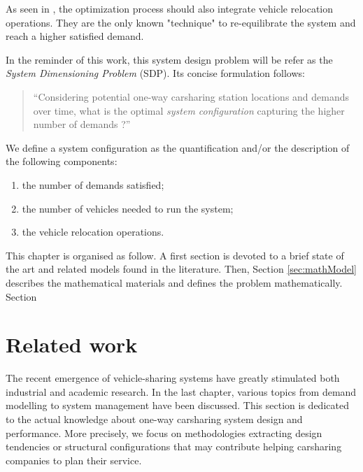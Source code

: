 \begin{bibunit}[ieeetr]
As seen in \cite{les_relocs_sont_importantes_et_necessaires}, the optimization process should also integrate vehicle relocation operations.
They are the only known "technique" to re-equilibrate the system and reach a higher satisfied demand.

In the reminder of this work, this system design problem will be refer as the \emph{System Dimensioning Problem} (SDP).
Its concise formulation follows:
\begin{quote}
``Considering potential one-way carsharing station locations and demands over time, what is the optimal \emph{system configuration} capturing the higher number of demands ?''
\end{quote}

We define a system configuration as the quantification and/or the description of the following components:
\begin{enumerate}
\item the number of demands satisfied;
\item the number of vehicles needed to run the system;
\item the vehicle relocation operations.
\end{enumerate}

This chapter is organised as follow.
A first section is devoted to a brief state of the art and related models found in the literature.
Then, Section \ref{sec:mathModel} describes the mathematical materials and defines the problem mathematically.
Section 


\newpage
\section{Related work}

The recent emergence of vehicle-sharing systems have greatly stimulated both industrial and academic research.
In the last chapter, various topics from demand modelling to system management have been discussed.
This section is dedicated to the actual knowledge about one-way carsharing system design and performance.
More precisely, we focus on methodologies extracting design tendencies or structural configurations that may contribute helping carsharing companies to plan their service.


\end{bibunit}
